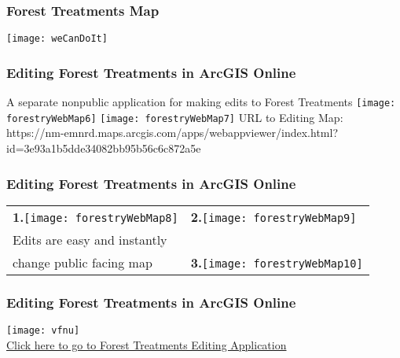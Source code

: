 \documentclass[t]{beamer} %
\begin{document}

\begin{frame}
\frametitle{Forest Treatments Map}
\vspace{-0.2in}
\center
\texttt{[image: weCanDoIt]}
\end{frame}


\begin{frame}
\frametitle{Editing Forest Treatments in ArcGIS Online}
A separate nonpublic application for making edits to Forest Treatments
\center
\texttt{[image: forestryWebMap6]}
\hfill\texttt{[image: forestryWebMap7]} 
\vspace{0.2in}
URL to Editing Map: \tiny{https://nm-emnrd.maps.arcgis.com/apps/webappviewer/index.html?id=3e93a1b5dde34082bb95b56c6c872a5e}

\end{frame}


\begin{frame}
\frametitle{Editing Forest Treatments in ArcGIS Online}

\vspace{-0.2in}
\begin{table}
\begin{tabular}{l l}
\textbf{1.}\texttt{[image: forestryWebMap8]} & \textbf{2.}\texttt{[image: forestryWebMap9]}\\
Edits are easy and instantly \\change public facing map         	     & \textbf{3.}\texttt{[image: forestryWebMap10]}
\end{tabular}
\end{table}
\end{frame}


\begin{frame}
\frametitle{Editing Forest Treatments in ArcGIS Online}
\vspace{-0.1in}
\texttt{[image: vfnu]}\\
\small{\href{https://nm-emnrd.maps.arcgis.com/apps/webappviewer/index.html?id=3e93a1b5dde34082bb95b56c6c872a5e}{Click here to go to Forest Treatments Editing Application}}
\end{frame}
\end{document}
